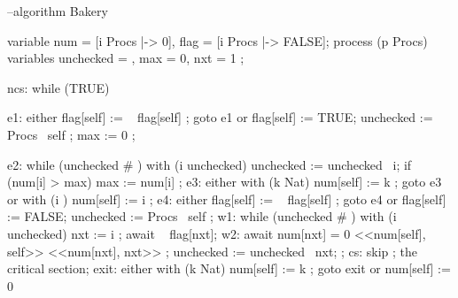 \documentclass[fleqn,leqno]{article}
\begin{document}
\begin{verbatim*}
--algorithm Bakery 
{ variable num = [i \in Procs |-> 0], flag = [i \in Procs |-> FALSE];
  process (p \in Procs)
    variables unchecked = {}, max = 0, nxt = 1 ;
    { ncs: while (TRUE) 
            { e1:   either { flag[self] := ~ flag[self] ;
                             goto e1 }
                    or     { flag[self] := TRUE;
                             unchecked := Procs \ {self} ;
                             max := 0
                           } ;
                    
              e2:   while (unchecked # {}) 
                      { with (i \in unchecked) 
                          { unchecked := unchecked \ {i};
                            if (num[i] > max) { max := num[i] }
                          }
                      };
              e3:   either { with (k \in Nat) { num[self] := k } ;
                             goto e3 }
                    or     { with (i ) 
                               { num[self] := i }
                           } ;
              e4:   either { flag[self] := ~ flag[self] ;
                             goto e4 }
                    or     { flag[self] := FALSE;
                               unchecked := Procs \ {self} 
                           } ;
              w1:   while (unchecked # {}) 
                      {     with (i \in unchecked) { nxt := i };
                            await ~ flag[nxt];
                        w2: await \/ num[nxt] = 0
                                  \/ <<num[self], self>> \prec <<num[nxt], nxt>> ;
                            unchecked := unchecked \ {nxt};
                      } ;
              cs:   skip ;  \* the critical section;
              exit: either { with (k \in Nat) { num[self] := k } ;
                             goto exit }
                    or     { num[self] := 0 } 
            }
    }
}
\end{verbatim*}
\vspace{-2em}
\end{document}
